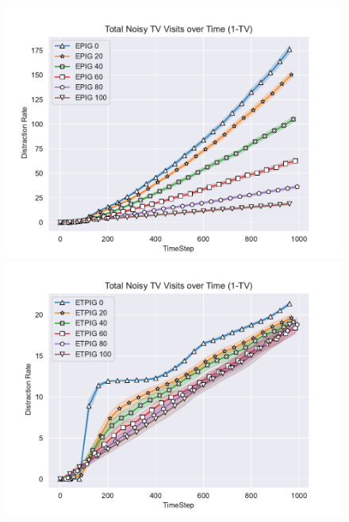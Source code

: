 \documentclass[12pt]{thesis}
\begin{document}
\begin{figure}[p]
	\includegraphics[scale=0.5]{"images/Epsilon_Distractions_EPIG_1-TV.pdf"}
	\includegraphics[scale=0.5]{"images/Epsilon_Distractions_ETPIG_1-TV.pdf"}
	

\end{figure}
\end{document}
